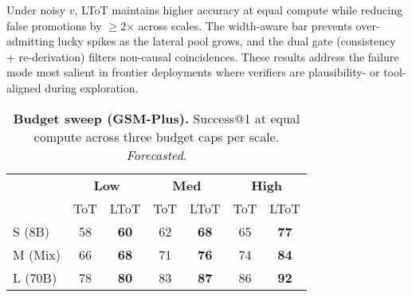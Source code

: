 \documentclass{article}
\begin{document}
\begin{table}[t]
\centering
\caption{\textbf{Noisy/nonstationary evaluator.} MATH-500 Success@1 and false-promotion rate (FPR, \%). \emph{Forecasted}.}
\vspace{0.3em}
\label{tab:noisy-math}
\end{table}

Under noisy $v$, LToT maintains higher accuracy at equal compute while reducing false promotions by $\ge$2$\times$ across scales.
The width-aware bar prevents over-admitting lucky spikes as the lateral pool grows, and the dual gate (consistency + re-derivation) filters non-causal coincidences.
These results address the failure mode most salient in frontier deployments where verifiers are plausibility- or tool-aligned during exploration.

\begin{table}[t]
\centering
\caption{\textbf{Budget sweep (GSM-Plus).} Success@1 at equal compute across three budget caps per scale. \emph{Forecasted}.}
\vspace{0.3em}
\begin{tabular}{lcccccc}
\toprule
 & \multicolumn{2}{c}{\textbf{Low}} & \multicolumn{2}{c}{\textbf{Med}} & \multicolumn{2}{c}{\textbf{High}} \\
\cmidrule(lr){2-3}\cmidrule(lr){4-5}\cmidrule(lr){6-7}
 & ToT & LToT & ToT & LToT & ToT & LToT \\
\midrule
S (8B)  & 58 & \textbf{60} & 62 & \textbf{68} & 65 & \textbf{77} \\
M (Mix) & 66 & \textbf{68} & 71 & \textbf{76} & 74 & \textbf{84} \\
L (70B) & 78 & \textbf{80} & 83 & \textbf{87} & 86 & \textbf{92} \\
\bottomrule
\end{tabular}
\label{tab:budget-gsm}
\end{table}
\end{document}
